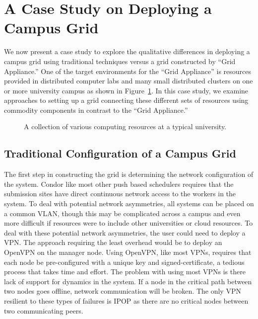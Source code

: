 \documentclass[conference]{IEEEtran}
\begin{document}
\section{A Case Study on Deploying a Campus Grid}
\label{case_study}

We now present a case study to explore the qualitative differences in deploying
a campus grid using traditional techniques versus a grid constructed by ``Grid
Appliance.''  One of the target environments for the ``Grid Appliance'' is
resources provided in distributed computer labs and many small distributed
clusters on one or more university campus as shown in
Figure~\ref{fig:unconnected}.  In this case study, we examine approaches to
setting up a grid connecting these different sets of resources using commodity
components in contrast to the ``Grid Appliance.''

\begin{figure}[ht]
\centering
{}
\caption{A collection of various computing resources at a typical university.}
\label{fig:unconnected}
\end{figure}

\subsection{Traditional Configuration of a Campus Grid}

The first step in constructing the grid is determining the network
configuration of the system.  Condor like most other push based schedulers
requires that the submission sites have direct continuous network access to the
workers in the system.  To deal with potential network asymmetries, all systems
can be placed on a common VLAN, though this may be complicated across a campus
and even more difficult if resources were to include other universities or
cloud resources.  To deal with these potential network asymmetries, the user
could need to deploy a VPN.  The approach requiring the least overhead would be
to deploy an OpenVPN on the manager node.  Using OpenVPN, like most VPNs,
requires that each node be pre-configured with a unique key and
signed-certificate, a tedious process that takes time and effort.  The problem
with using most VPNs is there lack of support for dynamics in the system.  If a
node in the critical path between two nodes goes offline, network communication
will be broken.  The only VPN resilient to these types of failures is IPOP as
there are no critical nodes between two communicating peers.
\end{document}
